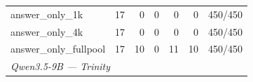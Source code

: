 \begin{table}[t]
{\begin{tabular}{lrrrrrr}
answer\_only\_1k & 17 & 0 & 0 & 0 & 0 & 450/450 \\
answer\_only\_4k & 17 & 0 & 0 & 0 & 0 & 450/450 \\
answer\_only\_fullpool & 17 & 10 & 0 & 11 & 10 & 450/450 \\
\midrule
\multicolumn{7}{l}{\textit{Qwen3.5-9B --- Trinity}} \\

\end{tabular}}
\end{table}
